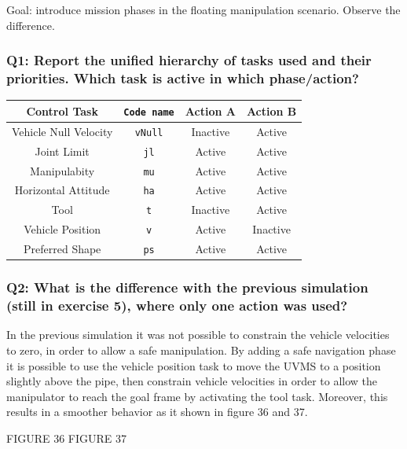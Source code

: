 \documentclass{article}
\begin{document}
Goal: introduce mission phases in the floating manipulation scenario. Observe the difference.

\subsubsection{Q1: Report the unified hierarchy of tasks used and their priorities. Which task is active in which phase/action?}

\begin{center}
\begin{tabular}{ | c | c | c | c |}
\hline
 Control Task & \texttt{Code name} & Action A & Action B \\
 \hline
 Vehicle Null Velocity & \texttt{vNull} & Inactive & Active \\
 Joint Limit & \texttt{jl} & Active & Active \\
 Manipulabity &  \texttt{mu} & Active & Active\\
 Horizontal Attitude &  \texttt{ha} & Active & Active \\
 Tool  &  \texttt{t} & Inactive & Active\\
 Vehicle Position &  \texttt{v} &Active & Inactive\\
 Preferred Shape & \texttt{ps} & Active & Active\\
 \hline
\end{tabular}
\end{center}

\subsubsection{Q2: What is the difference with the previous simulation (still in exercise 5), where only one action was used?}
In the previous simulation it was not possible to constrain the vehicle velocities to zero, in order to allow a safe manipulation. By adding a safe navigation phase it is possible to use the vehicle position task to move the UVMS to a position slightly above the pipe, then constrain vehicle velocities in order to allow the manipulator to reach the goal frame by activating the tool task. Moreover, this results in a smoother behavior as it shown in figure 36 and 37.

FIGURE 36 
FIGURE 37

\end{document}
